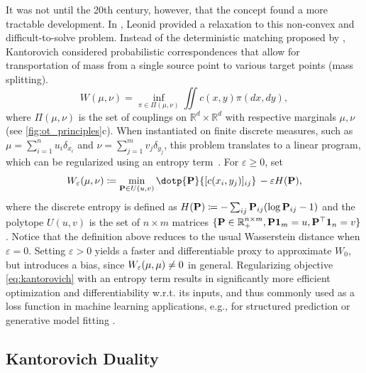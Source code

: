 It was not until the 20th century, however, that the concept found a more tractable development. In \citeyear{kantorovich1942transfer}, Leonid \citeauthor{kantorovich1942transfer} provided a relaxation to this non-convex and difficult-to-solve problem.
Instead of the deterministic matching proposed by \citeauthor{monge1781histoire}, Kantorovich considered probabilistic correspondences that allow for transportation of mass from a single source point to various target points (mass splitting).
\begin{equation} \label{eq:kantorovich}
    W(\mu, \nu) = \inf_{\pi\in \Pi(\mu,\nu)}\iint c(x, y) \pi(dx, dy),
\end{equation}
where $\Pi(\mu, \nu)$ is the set of couplings on $\mathbb{R}^d\times\mathbb{R}^d$ with respective marginals $\mu, \nu$ (see \cref{fig:ot_principles}c). 
When instantiated on finite discrete measures, such as $\mu=\sum_{i=1}^n u_i\delta_{x_i}$ and $\nu=\sum_{j=1}^m v_j\delta_{y_j}$, this problem translates to a linear program, which can be regularized using an entropy term~\citep{cuturi2013sinkhorn,peyre2019computational}. For $\varepsilon\geq0$, set 
\begin{equation}\label{eq:reg-ot}
\We(\mu,\nu) \defeq \min_{\bP\in U(u, v)} \dotp{\bP}{[c(x_i, y_j)]_{ij}}  \,-\varepsilon H(\bP),
\end{equation}
where the discrete entropy is defined as $H(\mathbf{P}) \coloneqq -\sum_{ij} \mathbf{P}_{ij} (\log \mathbf{P}_{ij} - 1)$ and the polytope $U(u, v)$ is the set of $n\times m$ matrices $\{\mathbf{P}\in\mathbb{R}^{n \times m}_+, \mathbf{P}\mathbf{1}_m =u, \mathbf{P}^\top\mathbf{1}_n=v\}$. 
Notice that the definition above reduces to the usual Wasserstein distance when $\varepsilon=0$. Setting $\varepsilon>0$ yields a faster and differentiable proxy to approximate $W_{0}$, but introduces a bias, since $W_{\varepsilon}(\mu,\mu)\ne 0$ in general.
Regularizing objective \eqref{eq:kantorovich} with an entropy term results in significantly more efficient optimization \citep{cuturi2013sinkhorn} and differentiability w.r.t. its inputs, and thus commonly used as a loss function in machine learning applications, e.g., for structured prediction \citep{frogner2015learning,janati2020multi} or generative model fitting \citep{arjovsky2017wasserstein, salimans2018improving, genevay2018learning}.


\subsection{Kantorovich Duality} \label{sec:background_dual}

